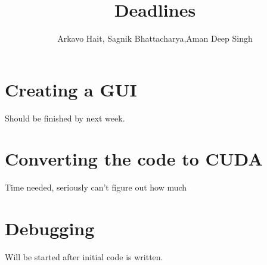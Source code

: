 \documentclass{article}
\title{Deadlines}
\author{Arkavo Hait, Sagnik Bhattacharya,Aman Deep Singh}
\begin{document}
  \section{Creating a GUI}
  Should be finished by next week.
  \section{Converting the code to CUDA}
  Time needed, seriously can't figure out how much
  \section{Debugging}
  Will be started after initial code is written.
\end{document}
